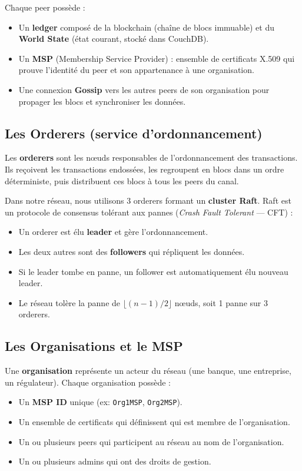 \documentclass[12pt,a4paper,twoside]{report}
\begin{document}
Chaque peer possède :
\begin{itemize}
    \item Un \textbf{ledger} composé de la blockchain (chaîne de blocs immuable) et du \textbf{World State} (état courant, stocké dans CouchDB).
    \item Un \textbf{MSP} (Membership Service Provider) : ensemble de certificats X.509 qui prouve l'identité du peer et son appartenance à une organisation.
    \item Une connexion \textbf{Gossip} vers les autres peers de son organisation pour propager les blocs et synchroniser les données.
\end{itemize}

\subsection{Les Orderers (service d'ordonnancement)}

Les \textbf{orderers} sont les nœuds responsables de l'ordonnancement des transactions. Ils reçoivent les transactions endossées, les regroupent en blocs dans un ordre déterministe, puis distribuent ces blocs à tous les peers du canal.

Dans notre réseau, nous utilisons 3 orderers formant un \textbf{cluster Raft}. Raft est un protocole de consensus tolérant aux pannes (\textit{Crash Fault Tolerant} --- CFT) :
\begin{itemize}
    \item Un orderer est élu \textbf{leader} et gère l'ordonnancement.
    \item Les deux autres sont des \textbf{followers} qui répliquent les données.
    \item Si le leader tombe en panne, un follower est automatiquement élu nouveau leader.
    \item Le réseau tolère la panne de $\lfloor (n-1)/2 \rfloor$ nœuds, soit 1 panne sur 3 orderers.
\end{itemize}

\subsection{Les Organisations et le MSP}

Une \textbf{organisation} représente un acteur du réseau (une banque, une entreprise, un régulateur). Chaque organisation possède :
\begin{itemize}
    \item Un \textbf{MSP ID} unique (ex: \texttt{Org1MSP}, \texttt{Org2MSP}).
    \item Un ensemble de certificats qui définissent qui est membre de l'organisation.
    \item Un ou plusieurs peers qui participent au réseau au nom de l'organisation.
    \item Un ou plusieurs admins qui ont des droits de gestion.
\end{itemize}
\end{document}
